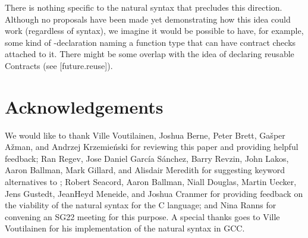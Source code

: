 There is nothing specific to the natural syntax that precludes this direction. Although no proposals have been made yet demonstrating how this idea could work (regardless of syntax), we imagine it would be possible to have, for example, some kind of -declaration naming a function type that can have contract checks attached to it. There might be some overlap with the idea of declaring reusable Contracts (see [future.reuse]).

\section*{Acknowledgements}

We would like to thank Ville Voutilainen, Joshua Berne, Peter Brett, Ga\v sper A\v zman, and Andrzej Krzemie\' nski for reviewing this paper and providing helpful feedback;
Ran Regev, Jose Daniel Garc\' ia S\' anchez, Barry Revzin, John Lakos, Aaron Ballman, Mark Gillard, and Alisdair Meredith for suggesting keyword alternatives to ; 
Robert Seacord, Aaron Ballman, Niall Douglas, Martin Uecker, Jens Gustedt, JeanHeyd Meneide, and Joshua Cranmer for providing feedback on the viability of the natural syntax for the C language; and
Nina Ranns for convening an SG22 meeting for this purpose.
A special thanks goes to Ville Voutilainen for his implementation of the natural syntax in GCC.



\renewcommand{\addcontentsline}[3]{}%







